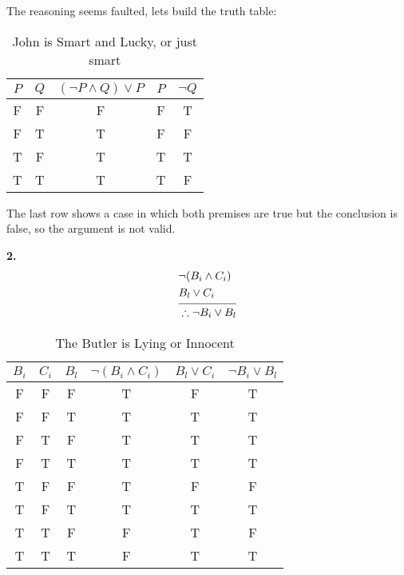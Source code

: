   The reasoning seems faulted, lets build the truth table:

  \begin{table}[h]
  \centering
  \label{tab:smart_and_lucky }
  \begin{tabular}{|c|c|c|c|c|}
    \hline
    $P$ & $Q$ &  $(\neg P \land Q) \lor P$ & $P$ & $\neg Q$\\
    \hline 
    F & F & F & F & T\\   
    F & T & T & F & F\\
    T & F & T & T & T\\
    T & T & T & T & F\\ 
    \hline
  \end{tabular}
  \caption{John is Smart and Lucky, or just smart}
\end{table}

The last row shows a case in which both premises are true but the conclusion is false, so the argument is not valid.

\sol \textbf{2.} 
  \begin{align*}
      &\neg (B_i \land C_i)\\
      &B_l \lor C_i\\
            \noalign{\vspace{-8pt}}
            \cline{1-2}
            \noalign{\vspace{-4pt}}
      &\therefore \neg B_i \lor B_l\\
  \end{align*}

  \newpage

  \begin{table}[h]
  \centering
  \label{tab:lying_or_innocent }
  \begin{tabular}{|c|c|c|c|c|c|}
    \hline
    $B_i$ & $C_i$ & $B_l$ & $\neg (B_i \land C_i)$ & $B_l \lor C_i$ & $\neg B_i \lor B_l$\\ 
    \hline 
    F & F & F & T & F & T\\ 
    F & F & T & T & T & T\\ 
    F & T & F & T & T & T\\ 
    F & T & T & T & T & T\\   
    T & F & F & T & F & F\\
    T & F & T & T & T & T\\
    T & T & F & F & T & F\\
    T & T & T & F & T & T\\    
    \hline
  \end{tabular}
  \caption{The Butler is Lying or Innocent}
\end{table}

